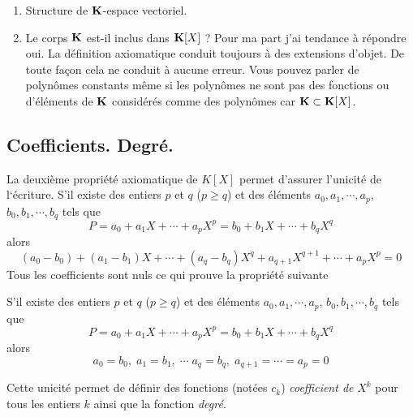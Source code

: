 \begin{rems}
 \begin{enumerate}
  \item Structure de $\mathbf{K}$-espace vectoriel.
  \item Le corps $\mathbf{K}$ est-il inclus dans $\mathbf{K}[X]$ ?\newline
Pour ma part j'ai tendance à répondre oui. La définition axiomatique conduit toujours à des extensions d'objet. De toute façon cela ne conduit à aucune erreur. Vous pouvez parler  de polynômes constants même si les polynômes ne sont pas des fonctions ou d'éléments de $\mathbf{K}$ considérés comme des polynômes car $\mathbf{K}\subset \mathbf{K}[X]$. 
 \end{enumerate}

\end{rems}

  \subsection{Coefficients. Degré.}
La deuxième propriété axiomatique de $K[X]$ permet d'assurer l'unicité de l`écriture. S'il existe des entiers $p$ et $q$ ($p\geq q$) et des éléments $a_0,a_1,\cdots,a_p$, $b_0,b_1,\cdots,b_q$ tels que 
\begin{displaymath}
 P = a_0 + a_1X + \cdots + a_pX^p = b_0 + b_1X + \cdots +b_qX^q
\end{displaymath}
alors
\begin{displaymath}
 (a_0-b_0) + (a_1-b_1)X + \cdots + (a_q-b_q)X^q +a_{q+1}X^{q+1}+\cdots +a_pX^p = 0
\end{displaymath}
Tous les coefficients sont nuls ce qui prouve la propriété suivante 
\begin{frame}
\begin{prop}
S'il existe des entiers $p$ et $q$ ($p\geq q$) et des éléments $a_0,a_1,\cdots,a_p$, $b_0,b_1,\cdots,b_q$ tels que 
\begin{displaymath}
 P = a_0 + a_1X + \cdots + a_pX^p = b_0 + b_1X + \cdots +b_qX^q
\end{displaymath}
alors
\begin{displaymath}
 a_0=b_0,\; a_1=b_1, \; \cdots \;  a_q=b_q, \; a_{q+1}= \cdots =a_p =0
\end{displaymath}
\end{prop}
Cette unicité permet de définir des fonctions (notées $c_k$) \emph{coefficient de} $X^k$ pour tous les entiers $k$ ainsi que la fonction \emph{degré}.
 \end{frame}

